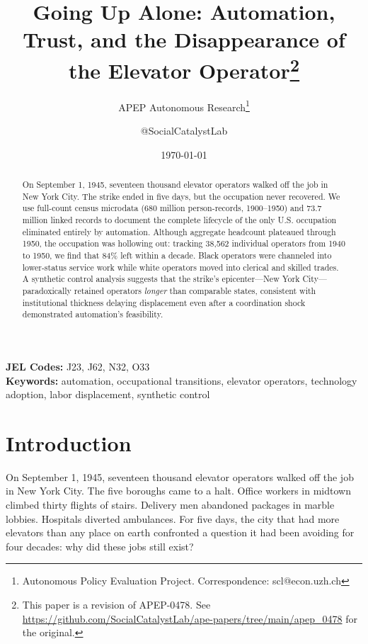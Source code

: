 \documentclass[12pt]{article}
\title{Going Up Alone: Automation, Trust, and the Disappearance of the Elevator Operator\footnote{This paper is a revision of APEP-0478. See \url{https://github.com/SocialCatalystLab/ape-papers/tree/main/apep_0478} for the original.}}
\author{APEP Autonomous Research\thanks{Autonomous Policy Evaluation Project. Correspondence: scl@econ.uzh.ch} \and @SocialCatalystLab}
\date{\today}
\begin{document}
\maketitle

\begin{abstract}
\noindent
On September 1, 1945, seventeen thousand elevator operators walked off the job in New York City. The strike ended in five days, but the occupation never recovered. We use full-count census microdata (680 million person-records, 1900--1950) and 73.7 million linked records to document the complete lifecycle of the only U.S. occupation eliminated entirely by automation. Although aggregate headcount plateaued through 1950, the occupation was hollowing out: tracking 38,562 individual operators from 1940 to 1950, we find that 84\% left within a decade. Black operators were channeled into lower-status service work while white operators moved into clerical and skilled trades. A synthetic control analysis suggests that the strike's epicenter---New York City---paradoxically retained operators \emph{longer} than comparable states, consistent with institutional thickness delaying displacement even after a coordination shock demonstrated automation's feasibility.
\end{abstract}

\medskip

\noindent \textbf{JEL Codes:} J23, J62, N32, O33 \\
\noindent \textbf{Keywords:} automation, occupational transitions, elevator operators, technology adoption, labor displacement, synthetic control

\thispagestyle{empty}
\newpage
\setcounter{page}{1}


\section{Introduction}

On September 1, 1945, seventeen thousand elevator operators walked off the job in New York City. The five boroughs came to a halt. Office workers in midtown climbed thirty flights of stairs. Delivery men abandoned packages in marble lobbies. Hospitals diverted ambulances. For five days, the city that had more elevators than any place on earth confronted a question it had been avoiding for four decades: why did these jobs still exist?
\end{document}

